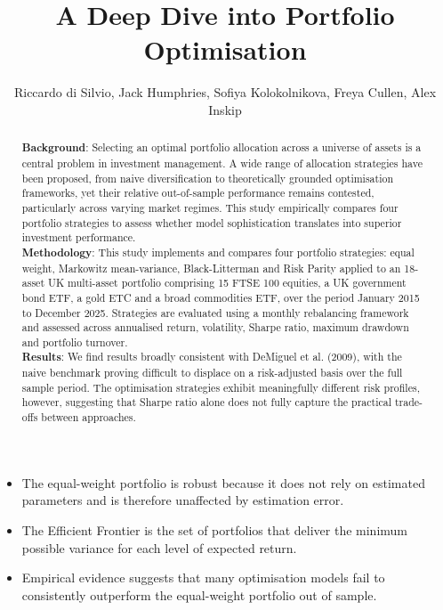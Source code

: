 \documentclass[a4paper,alpha-refs]{scr-contemporary}
\title{A Deep Dive into Portfolio Optimisation}
\author{\fontsize{12pt}{12pt}\selectfont Riccardo di Silvio, Jack Humphries, Sofiya Kolokolnikova, Freya Cullen, Alex Inskip}
\affil{Surrey Capital Research, University of Surrey}
\numberwithin{equation}{section}
\begin{document}
\begin{frontmatter}
\maketitle

\begin{abstract}

\textbf{Background}:
  Selecting an optimal portfolio allocation across a universe of assets is a central problem in 
  investment management. A wide range of allocation strategies have been proposed, from naive              
  diversification to theoretically grounded optimisation frameworks, yet their relative out-of-sample      
  performance remains contested, particularly across varying market regimes.  
  This study empirically compares four portfolio strategies to assess whether model sophistication translates 
  into superior investment performance. \\
\vspace{0.5mm}
\textbf{Methodology}:
  This study implements and compares four portfolio strategies: equal weight, Markowitz mean-variance, 
  Black-Litterman and Risk Parity applied to an 18-asset UK multi-asset portfolio comprising 15 FTSE 100 equities, 
  a UK government bond ETF, a gold ETC and a broad commodities ETF, over the period January 2015 to December 2025. 
  Strategies are evaluated using a monthly rebalancing framework and assessed across annualised return, volatility, 
  Sharpe ratio, maximum drawdown and portfolio turnover. \\
\vspace{0.5mm}
  \textbf{Results}:
  We find results broadly consistent with DeMiguel et al. (2009), with the naive benchmark 
  proving difficult to displace on a risk-adjusted basis over the full sample period. The optimisation 
  strategies exhibit meaningfully different risk profiles, however, suggesting that Sharpe ratio alone does not 
  fully capture the practical trade-offs between approaches. \\
\end{abstract}

\end{frontmatter}

\begin{keypoints*}
\begin{itemize}
  \item The equal-weight portfolio is robust because it does not rely on 
  estimated parameters and is therefore unaffected by estimation error.
  \item The Efficient Frontier is the set of portfolios that deliver the minimum 
  possible variance for each level of expected return.
  \item Empirical evidence suggests that many optimisation models fail to 
  consistently outperform the equal-weight portfolio out of sample.
\end{itemize}
\end{keypoints*}
\end{document}
